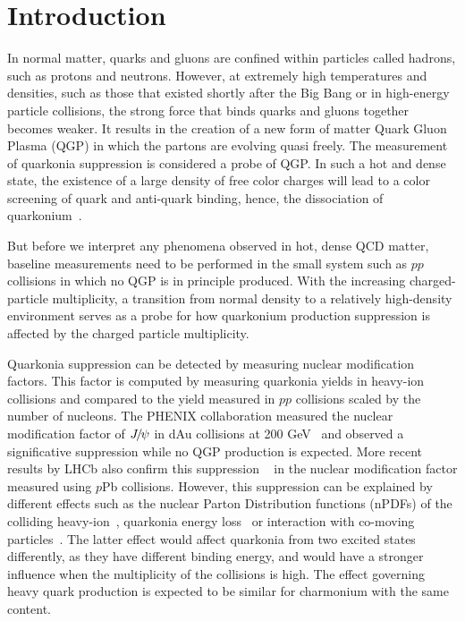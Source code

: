 \section{Introduction}
\label{sec:Introduction}
In normal matter, quarks and gluons are confined within particles called hadrons, such as protons and neutrons. However, at extremely high temperatures and densities, such as those that existed shortly after the Big Bang or in high-energy particle collisions, the strong force that binds quarks and gluons together becomes weaker. It results in the creation of a new form of matter Quark Gluon Plasma (QGP) in which the partons are evolving quasi freely. The measurement of quarkonia suppression is considered a probe of QGP. In such a hot and dense state, the existence of a large density of free color charges will lead to a color screening of quark and anti-quark binding, hence, the dissociation of quarkonium~\cite{MATSUI1986416}.

But before we interpret any phenomena observed in hot, dense QCD matter, baseline measurements need to be performed in the small system such as $pp$ collisions in which no QGP is in principle produced. With the increasing charged-particle multiplicity, a transition from normal density to a relatively high-density environment serves as a probe for how quarkonium production suppression is affected by the charged particle multiplicity. 

Quarkonia suppression can be detected by measuring nuclear modification factors. This factor is computed by measuring quarkonia yields in heavy-ion collisions and compared to the yield measured in $pp$ collisions scaled by the number of nucleons. The PHENIX collaboration measured the nuclear modification factor of ${{J\mskip -3mu/\mskip -2mu\psi}}$ in dAu collisions at 200 GeV~\cite{PHENIX:2007tnc} and observed a significative suppression while no QGP production is expected. More recent results by LHCb also confirm this suppression ~\cite{LHCb:2017ygo} in the nuclear modification factor measured using $p$Pb collisions. However, this suppression can be explained by different effects such as the nuclear Parton Distribution functions (nPDFs) of the colliding heavy-ion~\cite{AtashbarTehrani:2017mzi}, quarkonia energy loss~\cite{Arleo:2014oha} or interaction with co-moving particles~\cite{Ferreiro:2012rq}. The latter effect would affect quarkonia from two excited states differently, as they have different binding energy, and would have a stronger influence when the multiplicity of the collisions is high. The effect governing heavy quark production is expected to be similar for charmonium with the same content.

